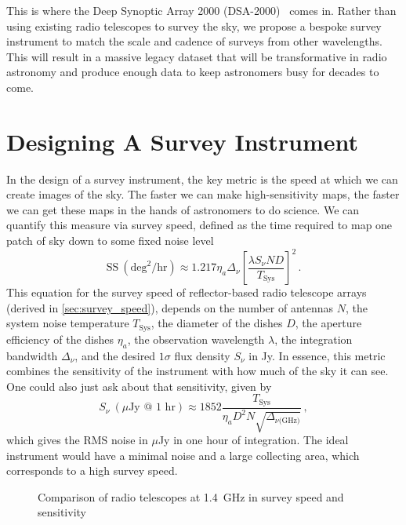 This is where the Deep Synoptic Array 2000 (DSA-2000)~\cite{hallinanDSA2000RadioSurvey2019} comes in.
Rather than using existing radio telescopes to survey the sky, we propose a bespoke survey instrument to match the scale and cadence of surveys from other wavelengths.
This will result in a massive legacy dataset that will be transformative in radio astronomy and produce enough data to keep astronomers busy for decades to come.

\section{Designing A Survey Instrument}

In the design of a survey instrument, the key metric is the speed at which we can create images of the sky.
The faster we can make high-sensitivity maps, the faster we can get these maps in the hands of astronomers to do science.
We can quantify this measure via survey speed, defined as the time required to map one patch of sky down to some fixed noise level
\begin{equation}
        \text{SS}~(\text{deg}^2/\text{hr}) \approx 1.217\eta_a\Delta_\nu\left[\frac{\lambda S_\nu N D}{T_\text{Sys}}\right]^2\,.
\end{equation}
This equation for the survey speed of reflector-based radio telescope arrays (derived in \autoref{sec:survey_speed}), depends on the number of antennas $N$, the system noise temperature $T_\text{Sys}$, the diameter of the dishes $D$, the aperture efficiency of the dishes $\eta_a$, the observation wavelength $\lambda$, the integration bandwidth $\Delta_\nu$, and the desired $1\sigma$ flux density $S_\nu$ in Jy.
In essence, this metric combines the sensitivity of the instrument with how much of the sky it can see.
One could also just ask about that sensitivity, given by
\begin{equation}
    S_\nu~(\mu\text{Jy @ 1 hr}) \approx 1852\frac{T_\text{Sys}}{\eta_aD^2N\sqrt{\Delta_{\nu\text{(GHz)}}}}\,,
\end{equation}
which gives the RMS noise in $\mu$Jy in one hour of integration.
The ideal instrument would have a minimal noise and a large collecting area, which corresponds to a high survey speed.

\begin{figure}[ht!]
    \centering
    
    \caption{Comparison of radio telescopes at \qty{1.4}{\GHz} in survey speed and sensitivity}
    \label{fig:dsa2000_compare}
\end{figure}

